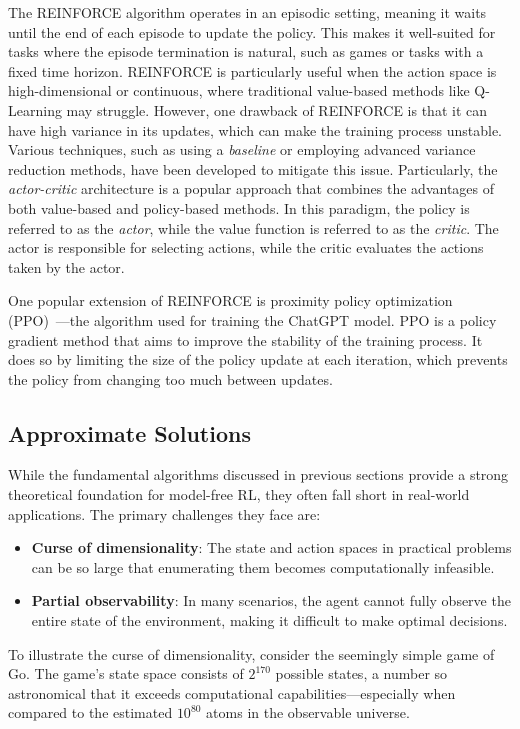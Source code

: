 The REINFORCE algorithm operates in an episodic setting, 
 meaning it waits until the end of each episode to update the policy. 
 This makes it well-suited for tasks where the episode termination is natural, 
 such as games or tasks with a fixed time horizon.
%
REINFORCE is particularly useful when the action space is high-dimensional or continuous, 
 where traditional value-based methods like Q-Learning may struggle.  
 However, one drawback of REINFORCE is that it can have high variance in its updates, 
 which can make the training process unstable. 
%
Various techniques, such as using a \emph{baseline} 
 or employing advanced variance reduction methods, have been developed to mitigate this issue.
 Particularly, the \emph{actor-critic} architecture is a popular approach that combines the advantages of both value-based and policy-based methods.
 In this paradigm, the policy is referred to as the \emph{actor}, while the value function is referred to as the \emph{critic}.
The actor is responsible for selecting actions, while the critic evaluates the actions taken by the actor.

One popular extension of REINFORCE is proximity policy optimization (PPO)~\cite{ppo}---the algorithm used for training the ChatGPT model. 
 PPO is a policy gradient method that aims to improve the stability of the training process. 
 It does so by limiting the size of the policy update at each iteration, 
 which prevents the policy from changing too much between updates. 
\subsection{Approximate Solutions}

While the fundamental algorithms discussed in previous sections provide a strong theoretical foundation for model-free RL, 
 they often fall short in real-world applications. 
 The primary challenges they face are:

\begin{itemize}
  \item \textbf{Curse of dimensionality}: The state and action spaces in practical problems can be so large that enumerating them becomes computationally infeasible.
  \item \textbf{Partial observability}: In many scenarios, the agent cannot fully observe the entire state of the environment, 
  making it difficult to make optimal decisions.
\end{itemize}
To illustrate the curse of dimensionality, 
 consider the seemingly simple game of Go. 
 The game's state space consists of \(2^{170}\) possible states, 
 a number so astronomical that it exceeds computational capabilities—especially when compared to the estimated \(10^{80}\) atoms in the observable universe.

